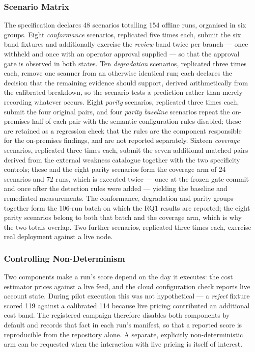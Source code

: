 \subsubsection{Scenario Matrix}

The specification declares 48 scenarios
totalling 154 offline runs, organised in six groups. Eight \emph{conformance}
scenarios, replicated five times each, submit the six band fixtures and
additionally exercise the \emph{review} band twice per branch --- once withheld
and once with an operator approval supplied --- so that the approval gate is
observed in both states. Ten \emph{degradation} scenarios, replicated three
times each, remove one scanner from an otherwise identical run; each declares
the decision that the remaining evidence should support, derived arithmetically
from the calibrated breakdown, so the scenario tests a prediction rather than
merely recording whatever occurs. Eight \emph{parity} scenarios, replicated
three times each, submit the four original pairs, and four \emph{parity
baseline} scenarios repeat the on-premises half of each pair with the semantic
configuration rules disabled; these are retained as a regression check that the
rules are the component responsible for the on-premises findings, and are not
reported separately. Sixteen \emph{coverage} scenarios, replicated three times
each, submit the seven additional matched pairs derived from the external
weakness catalogue together with the two specificity controls; these and the
eight parity scenarios form the coverage arm of 24 scenarios and 72 runs, which
is executed twice --- once at the frozen gate commit and once after the
detection rules were added --- yielding the baseline and remediated
measurements. The conformance, degradation and parity groups together form the
106-run batch on which the RQ1 results are reported; the eight parity scenarios
belong to both that batch and the coverage arm, which is why the two totals
overlap. Two further scenarios,
replicated three times each, exercise real deployment against a live node.

\subsubsection{Controlling Non-Determinism}

Two components make a run's score depend on the day it executes: the cost
estimator prices against a live feed, and the cloud configuration check reports
live account state. During pilot execution this was not hypothetical --- a
\emph{reject} fixture scored 119 against a calibrated 114 because live pricing
contributed an additional cost band. The registered campaign therefore disables
both components by default and records that fact in each run's manifest, so that
a reported score is reproducible from the repository alone. A separate,
explicitly non-deterministic arm can be requested when the interaction with live
pricing is itself of interest.

